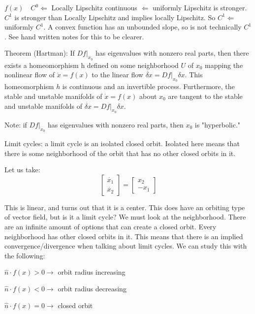 \documentclass[11pt]{article}
\begin{document}
$f(x) \quad C^0 \Leftarrow$ Locally Lipschitz continuous $\Leftarrow$ uniformly Lipschitz is stronger. $C^1$ is stronger than Locally Lipschitz and implies locally Lipschitz. So $C^1 \Leftarrow$ uniformly $C^1$. A convex function has an unbounded slope, so is not technically $C^1$. See hand written notes for this to be clearer.

Theorem (Hartman): If $Df\rvert_{x_0}$ has eigenvalues with nonzero real parts, then there exists a homeomorphism h defined on some neighborhood $U$ of $x_0$ mapping the nonlinear flow of $\dot{x} = f(x)$ to the linear flow $ \dot{\delta x} = Df\rvert_{x_0}\delta x$. This homeomorphism $h$ is continuous and an invertible process. Furthermore, the stable and unstable manifolds of $\dot{x} = f(x)$ about $x_0$ are tangent to the stable and unstable manifolds of $ \dot{\delta x} = Df\rvert_{x_0}\delta x$.

Note: if $Df\rvert_{x_0}$ has eigenvalues with nonzero real parts, then $x_0$ is "hyperbolic."


Limit cycles: a limit cycle is an isolated closed orbit. Isolated here means that there is some neighborhood of the orbit that has no other closed orbits in it. 

Let us take:
\begin{equation}
\begin{bmatrix}
\dot{x_1} \\
\dot{x_2}
\end{bmatrix}
=
\begin{bmatrix}
x_2 \\
-x_1
\end{bmatrix}
\end{equation}

This is linear, and turns out that it is a center. This does have an orbiting type of vector field, but is it a limit cycle? We must look at the neighborhood. There are an infinite amount of options that can create a closed orbit. Every neighborhood has other closed orbits in it. This means that there is an implied convergence/divergence when talking about limit cycles. We can study this with the following:

$\hat{n} \cdot f(x) >0 \rightarrow $ orbit radius increasing

$\hat{n} \cdot f(x) <0 \rightarrow $ orbit radius decreasing

$\hat{n} \cdot f(x) =0 \rightarrow $ closed orbit
\end{document}
